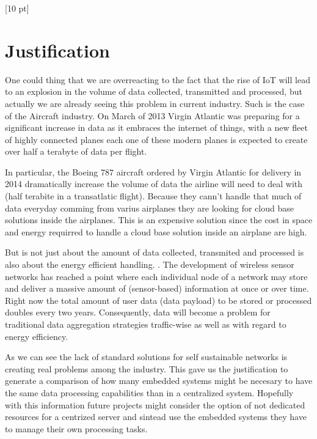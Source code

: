 \titleformat{\chapter}{\Huge\bfseries}{\thechapter}{0 pt}{\rule{340 pt}{3 pt}\\}
\titlespacing{\chapter}{100 pt}{-25 pt}{40 pt}[10 pt]	
\pagestyle{fancy}
\fancyhead[RO,RE]{\thepage}
\fancyfoot[CO,CE]{}

\chapter*{Justification}

\normalsize
\noindent

One could thing that we are overreacting to the fact that the rise of IoT will
lead to an explosion in the volume of data collected, transmitted and
processed, but actually we are already seeing this problem in current industry.
Such is the case of the Aircraft industry. On March of 2013 Virgin Atlantic was
preparing for a significant increase in data as it embraces the internet of
things, with a new fleet of highly connected planes each one of these modern
planes is expected to create over half a terabyte of data per flight.

In particular, the Boeing 787 aircraft ordered by Virgin Atlantic for delivery
in 2014  dramatically increase the volume of data the airline will need to deal
with (half terabite in a transatlatic flight).  Because they cann't handle that
much of data everyday comming from varius airplanes they are looking
for cloud base solutions inside the airplanes. This is an expensive solution
since the cost in space and energy requirred to handle a cloud base solution
inside an airplane are high.

But is not just about the amount of data collected, transmited and processed is
also about the energy efficient handling. \cite{Bergelt}. The development of
wireless sensor networks has reached a point where each individual node of a
network may store and deliver a massive amount of (sensor-based) information at
once or over time.  Right now the total amount of user data (data payload) to
be stored or processed doubles every two years. Consequently, data will become
a problem for traditional data aggregation strategies traffic-wise as well as
with regard to energy efficiency. 

As we can see the lack of standard solutions for self sustainable networks is 
creating real problems among the industry. This gave us the justification to
generate a comparison of how many embedded systems might be necesary to have
the same data processing capabilities than in a centralized system. Hopefully
with this information future projects might consider the option of not
dedicated resources for a centrized server and sintead use the embedded systems
they have to manage their own processing tasks.

\clearpage

